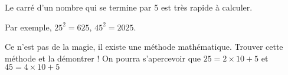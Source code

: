 
Le carré d'un nombre qui se termine par 5 est très rapide à calculer.

Par exemple, $25^2 = 625$, $45^2 = 2025$.

Ce n'est pas de la magie, il existe une méthode mathématique. Trouver cette méthode et la démontrer ! On pourra s'apercevoir que $25 = 2\times 10 + 5$ et $45=4\times 10 + 5$

